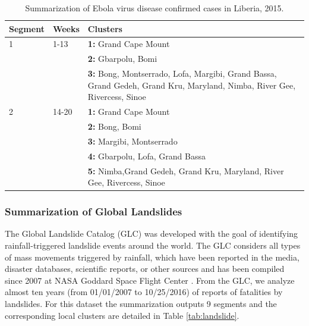 \begin{table}[!h]
\centering
    \caption{Summarization of Ebola virus disease confirmed cases in Liberia, 2015.}     
    \label{tab:ebola}
    \begin{small}
\begin{tabular}{p{0.35in}p{0.3in}p{2.3in}}
    \hline
    {\bfseries Segment} &{\bfseries Weeks} & {\bfseries  Clusters}   \\
    \hline
    1&1-13&  {\bfseries 1:} Grand Cape Mount    \\
    & & {\bfseries 2:}  Gbarpolu, Bomi   \\
    & & {\bfseries 3:} Bong, Montserrado, Lofa, Margibi, Grand Bassa, Grand Gedeh, Grand Kru, Maryland, Nimba, River Gee, Rivercess, Sinoe\\    \hline
     2&14-20 & {\bfseries 1:} Grand Cape Mount   \\
     & & {\bfseries 2:}  Bong, Bomi   \\
     & & {\bfseries 3:}  Margibi, Montserrado   \\
     & & {\bfseries 4:}  Gbarpolu, Lofa, Grand Bassa   \\
     & & {\bfseries 5:}  Nimba,Grand Gedeh, Grand Kru, Maryland, River Gee, Rivercess, Sinoe\\    \hline
    \end{tabular}
    \end{small} 
\end{table}

\subsubsection{Summarization of Global Landslides}
The Global Landslide Catalog (GLC) was developed with the goal of identifying rainfall-triggered landslide events around the world. The GLC considers all types of mass movements triggered by rainfall, which have been reported in the media, disaster databases, scientific reports, or other sources and has been compiled since 2007 at NASA Goddard Space Flight Center \cite{Kirschbaum:2010}. 
From the GLC, we analyze almost ten years (from 01/01/2007 to 10/25/2016) of reports of fatalities by landslides. 
For this dataset the summarization outputs 9 segments and the corresponding local clusters are detailed in Table \ref{tab:landslide}.

